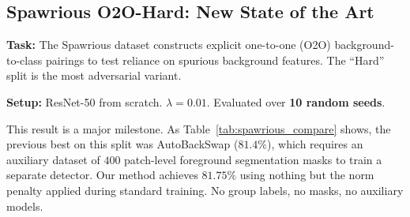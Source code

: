 \documentclass[11pt,a4paper]{article}
\begin{document}
\subsection{Spawrious O2O-Hard: New State of the Art}

\textbf{Task:} The Spawrious dataset constructs explicit one-to-one (O2O) background-to-class pairings to test reliance on spurious background features. The ``Hard'' split is the most adversarial variant.

\textbf{Setup:} ResNet-50 from scratch. $\lambda = 0.01$. Evaluated over \textbf{10 random seeds}.

\begin{table}[ht]
\centering
\caption{Spawrious O2O-Hard: per-seed test accuracy.}
\label{tab:spawrious_seeds}
\end{table}

This result is a major milestone. As Table~\ref{tab:spawrious_compare} shows, the previous best on this split was AutoBackSwap ($81.4\%$), which requires an auxiliary dataset of $400$ patch-level foreground segmentation masks to train a separate detector. Our method achieves $81.75\%$ using nothing but the norm penalty applied during standard training. No group labels, no masks, no auxiliary models.
\end{document}
